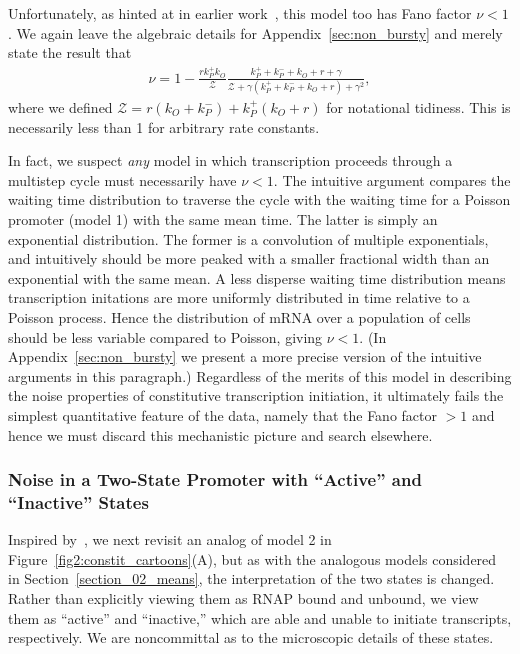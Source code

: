 Unfortunately, as hinted at in earlier work~\cite{Mitarai2015}, this model too
has Fano factor $\nu<1$. We again leave the algebraic details for
Appendix~\ref{sec:non_bursty} and merely state the result that
\begin{align}
\nu = 1 - \frac{r k_P^+ k_O}{\mathcal{Z}}
\frac{k_P^+ + k_P^- + k_O + r + \gamma}
    {\mathcal{Z} + \gamma(k_P^+ + k_P^- + k_O + r) + \gamma^2},
\label{eq:model3_fano}
\end{align}
where we defined $\mathcal{Z} = r(k_O + k_P^-) + k_P^+(k_O + r)$ for notational
tidiness. This is necessarily less than 1 for arbitrary rate constants.

In fact, we suspect \textit{any} model in which transcription proceeds through a
multistep cycle must necessarily have $\nu<1$. The intuitive argument compares
the waiting time distribution to traverse the cycle with the waiting time for a
Poisson promoter (model 1) with the same mean time. The latter is simply an
exponential distribution. The former is a convolution of multiple exponentials,
and intuitively should be more peaked with a smaller fractional width than an
exponential with the same mean.
A less disperse waiting time distribution means transcription initations are
more uniformly distributed in time relative to a Poisson process. Hence the
distribution of mRNA over a population of cells should be less variable compared
to Poisson, giving $\nu<1$.
(In Appendix~\ref{sec:non_bursty} we present a more precise version
of the intuitive arguments in this paragraph.)
Regardless of the merits of this model in describing the noise properties of
constitutive transcription initiation, it ultimately fails the simplest
quantitative feature of the data, namely that the Fano factor $> 1$ and hence
we must discard this mechanistic picture and search elsewhere.

\subsubsection{Noise in a Two-State Promoter with ``Active'' and ``Inactive''
States}

Inspired by~\cite{Razo-Mejia2020}, we next revisit an analog of model 2 in
Figure~\ref{fig2:constit_cartoons}(A), but as with
the analogous models considered in Section~\ref{section_02_means},
the interpretation of the two
states is changed. Rather than explicitly viewing them as RNAP bound and
unbound, we view them as ``active'' and ``inactive,'' which are able and unable
to initiate transcripts, respectively. We are noncommittal as to the microscopic
details of these states.

